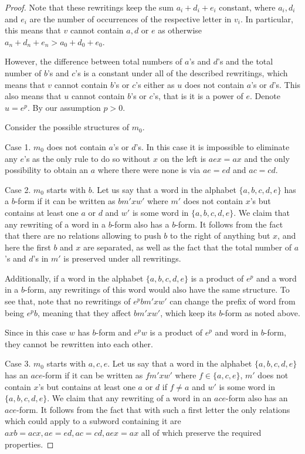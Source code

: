 \documentclass{article}
\theoremstyle{definition}
\begin{document}
\begin{proof}
Note that these rewritings keep the sum $a_i + d_i + e_i$ constant, where $a_i,d_i$ and $e_i$ are the number of occurrences of the respective letter in $v_i$. In particular, this means that $v$ cannot contain $a,d$ or $e$ as otherwise $a_n +d_n + e_n > a_0 + d_0 + e_0$.

However, the difference between total numbers of $a$'s and $d$'s and the total number of $b$'s and $c$'s is a constant under all of the described rewritings, which means that $v$ cannot contain $b$'s or $c$'s either as $u$ does not contain $a$'s or $d$'s. This also means that $u$ cannot contain $b$'s or $c$'s, that is it is a power of $e$. Denote $u = e^p$. By our assumption $p >0$.

Consider the possible structures of $m_0$.

Case 1. $m_0$ does not contain $a$'s or $d$'s. In this case it is impossible to eliminate any $e$'s as the only rule to do so without $x$ on the left is $aex = ax$ and the only possibility to obtain an $a$ where there were none is via $ae = ed$ and $ac = cd$.

Case 2. $m_0$ starts with $b$. Let us say that a word in the alphabet $\{a,b,c,d,e\}$ has a $b$-form if it can be written as $b m' x w'$ where $m'$ does not contain $x$'s but contains at least one $a$ or $d$ and $w'$ is some word in $\{a,b,c,d,e\}$. We claim that any rewriting of a word in a $b$-form also has a $b$-form. It follows from the fact that there are no relations allowing to push $b$ to the right of anything but $x$, and here the first $b$ and $x$ are separated, as well as the fact that the total number of $a$'s and $d$'s in $m'$ is preserved under all rewritings.

Additionally, if a word in the alphabet $\{a,b,c,d,e\}$ is a product of $e^p$ and a word in a $b$-form, any rewritings of this word would also have the same structure. To see that, note that no rewritings of $e^p b m' x w'$ can change the prefix of word from being $e^p b$, meaning that they affect $b m' x w'$, which keep its $b$-form as noted above.

Since in this case $w$ has $b$-form and $e^p w$ is a product of $e^p$ and word in $b$-form, they cannot be rewritten into each other.

Case 3. $m_0$ starts with $a,c,e$. Let us say that a word in the alphabet $\{a,b,c,d,e\}$ has an $ace$-form if it can be written as $f m' x w'$ where $f \in \{a,c,e\}$, $m'$ does not contain $x$'s but contains at least one $a$ or $d$ if $f \neq a$ and $w'$ is some word in $\{a,b,c,d,e\}$. We claim that any rewriting of a word in an $ace$-form also has an $ace$-form. It follows from the fact that with such a first letter the only relations which could apply to a subword containing it are $axb =acx, ae=ed, ac=cd, aex = ax$ all of which preserve the required properties.


\end{proof}
\end{document}
